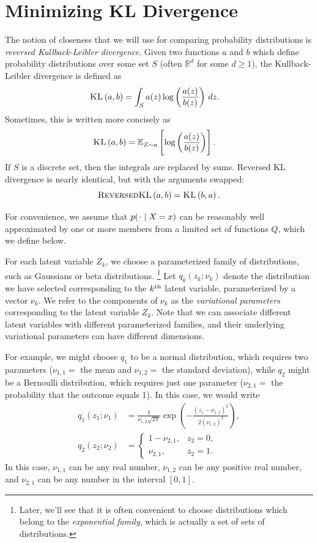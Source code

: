 \documentclass[11pt]{article}
\newcommand{\KL}[2]{\textsc{KL}\left( {#1} , {#2} \right)}
\newcommand{\rKL}[2]{\textsc{ReversedKL}\left( {#1} , {#2} \right)}
\newcommand*{\placeholder}{\makebox[1ex]{$\cdot$}}
\begin{document}
\section{Minimizing KL Divergence}

The notion of closeness that we will use for comparing probability distributions is \emph{reversed Kullback-Leibler divergence}.
Given two functions $a$ and $b$ which define probability distributions over some set $S$ (often $\mathbb R^d$ for some $d \geq 1$), the Kullback-Leibler divergence is defined as
\begin{align}
\KL{a}{b}
&= \int_S a(z) \log \left( \frac{a(z)}{b(z)} \right) \, dz.
\end{align}
Sometimes, this is written more concisely as
\begin{align}
\KL{a}{b}
&= \expectOver{Z \sim a}{ \log \left( \frac{a(z)}{b(z)} \right) }.
\end{align}
If $S$ is a discrete set, then the integrals are replaced by sums.
Reversed KL divergence is nearly identical, but with the arguments swapped:
\[ \rKL{a}{b} = \KL{b}{a}. \]

For convenience, we assume that $p(\placeholder \mid X = x)$ can be reasonably well approximated by one or more members from a limited set of functions $Q$, which we define below.

For each latent variable $Z_k$, we choose a parameterized family of distributions, such as Gaussians or beta distributions.%
\footnote{Later, we'll see that it is often convenient to choose distributions which belong to the \emph{exponential family}, which is actually a set of sets of distributions.}
Let $q_k(z_k; \nu_k)$ denote the distribution we have selected corresponding to the $k^{\mathrm{th}}$ latent variable, parameterized by a vector $\nu_k$.
We refer to the components of $\nu_k$ as the \emph{variational parameters} corresponding to the latent variable $Z_k$.
Note that we can associate different latent variables with different parameterized families, and their underlying variational parameters can have different dimensions.

For example, we might choose $q_1$ to be a normal distribution, which requires two parameters ($\nu_{1,1} =$ the mean and $\nu_{1,2} =$ the standard deviation), while $q_2$ might be a Bernoulli distribution, which requires just one parameter ($\nu_{2,1} =$ the probability that the outcome equals 1).
In this case, we would write
\begin{align}
q_1(z_1; \nu_1) &= \frac{1}{\nu_{1,2} \sqrt{2 \pi}} \exp\left( -\frac{(z_1 - \nu_{1,1})^2}{2 (\nu_{1,2})^2} \right), \\
q_2(z_2; \nu_2) &=
    \begin{cases}
    1-\nu_{2,1}, & z_2 = 0, \\
    \nu_{2,1},   & z_2 = 1.
    \end{cases}
\end{align}
In this case, $\nu_{1,1}$ can be any real number, $\nu_{1,2}$ can be any positive real number, and $\nu_{2,1}$ can be any number in the interval $[0,1]$.
\end{document}
